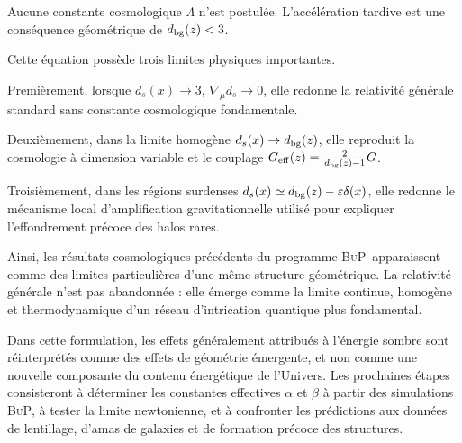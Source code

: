 \documentclass[11pt]{article}
\newcommand{\Geff}{G_{\rm eff}}
\newcommand{\BuP}{\textsc{BuP}}
\begin{document}
Aucune constante cosmologique $\Lambda$ n'est postul\'ee. L'acc\'el\'eration tardive
est une cons\'equence g\'eom\'etrique de $d_{\rm bg}(z)<3$.

Cette \'equation poss\`ede trois limites physiques importantes.

Premi\`erement, lorsque $d_s(x)\rightarrow 3$, $\nabla_\mu d_s\rightarrow0$, elle
redonne la relativit\'e g\'en\'erale standard sans constante cosmologique fondamentale.

Deuxi\`emement, dans la limite homog\`ene $d_s(x)\rightarrow d_{\rm bg}(z)$, elle
reproduit la cosmologie \`a dimension variable et le couplage
$\Geff(z)=\frac{2}{d_{\rm bg}(z)-1}G$.

Troisi\`emement, dans les r\'egions surdenses $d_s(x)\simeq d_{\rm bg}(z)-\varepsilon\delta(x)$,
elle redonne le m\'ecanisme local d'amplification gravitationnelle utilis\'e pour
expliquer l'effondrement pr\'ecoce des halos rares.

Ainsi, les r\'esultats cosmologiques pr\'ec\'edents du programme \BuP\ apparaissent
comme des limites particulières d'une m\^eme structure g\'eom\'etrique. La relativit\'e
g\'en\'erale n'est pas abandonn\'ee : elle \'emerge comme la limite continue, homog\`ene
et thermodynamique d'un r\'eseau d'intrication quantique plus fondamental.

Dans cette formulation, les effets g\'en\'eralement attribu\'es \`a l'\'energie sombre
sont r\'einterpr\'et\'es comme des effets de g\'eom\'etrie \'emergente, et non comme
une nouvelle composante du contenu \'energ\'etique de l'Univers. Les prochaines \'etapes
consisteront \`a d\'eterminer les constantes effectives $\alpha$ et $\beta$ \`a partir
des simulations \BuP, \`a tester la limite newtonienne, et \`a confronter les
pr\'edictions aux donn\'ees de lentillage, d'amas de galaxies et de formation pr\'ecoce
des structures.
\end{document}
